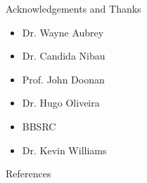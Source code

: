 \documentclass[final]{beamer}
\begin{document}
\begin{frame}{}
\begin{textblock}{28}
\begin{block}{Acknowledgements and Thanks}
      \begin{multicols}{3}

        \begin{itemize}
        \item{Dr. Wayne Aubrey}
        \item{Dr. Candida Nibau}

        \end{itemize}

        \columnbreak

        \begin{itemize}
        \item{Prof. John Doonan}
        \item{Dr. Hugo Oliveira}

        \end{itemize}

        \columnbreak

        \begin{itemize}
        \item{BBSRC}
        \item{Dr. Kevin Williams}
        \end{itemize}

      \end{multicols}

    \end{block}

    \begin{block}{References}
      
      
    \end{block}


  \end{textblock}

\end{frame}
\end{document}
